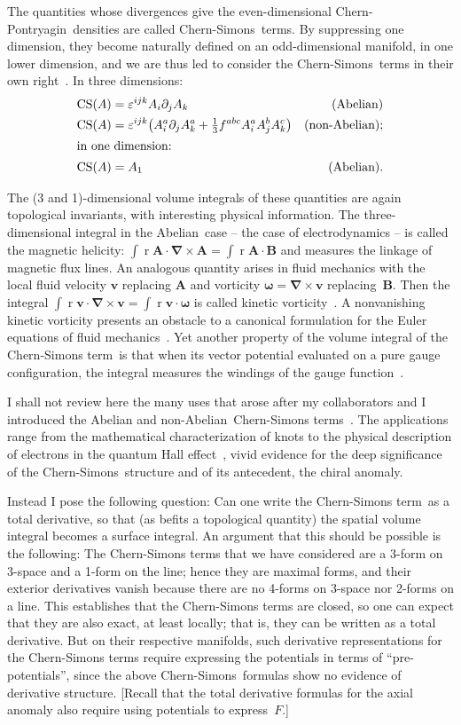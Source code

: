 \documentclass[a4paper,12pt,twoside]{article}
\newcommand{\rd}[1]{\mathop{\mathrm{d}#1}}
\newcommand{\fract}[2]{{\textstyle\frac{#1}{#2}}}
\newcommand{\grad}{\vec\nabla}
\newcommand{\nA}{non-Abelian}
\newcommand{\Ab}{Abelian}
\newcommand{\CS}{Chern-Simons}
\newcommand{\CSt}{Chern-Simons term}
\newcommand{\CPt}{Chern-Pontryagin}
\newcommand{\pp}[1]{\partial_{#1}}
\let\vec\boldsymbol
\let\eps\varepsilon
\begin{document}
The quantities whose divergences give the even-dimensional \CPt\ densities  are
called \CS\ terms. By suppressing one dimension, they become naturally defined on
an odd-dimensional manifold, in one lower  dimension,  and we are thus led to
consider the
\CS\ terms in their own right~\cite{ref7}. In three dimensions:
\begin{align}
\mathrm{CS}(A) &= \eps^{ijk} A_i \pp j A_k & \text{(Abelian)}\label{eq7}\\
\mathrm{CS}(A) &= \eps^{ijk} \bigl(A_i^a \pp j A_k^a +\fract13 f^{abc} A_i^a A_j^b
A_k^c\bigr)
 & \text{(non-Abelian);}\label{eq8}\\
\intertext{in one dimension:}
\mathrm{CS}(A) &= A_1 &\mbox{(\Ab).}\label{eq-9}
\end{align}

The (3 and 1)-dimensional volume integrals of these quantities are again topological
invariants, with interesting physical information. The three-dimensional integral in
the \Ab\ case -- the case of electrodynamics -- is called the magnetic helicity: 
$\int \rd{^3 r} \vec A\cdot \grad
\times \vec A = 
\int \rd{^3 r} \vec A\cdot \vec B$ and measures the linkage of magnetic flux lines.
An analogous quantity arises in fluid mechanics  with the local fluid velocity $\vec v$
replacing
$\vec A$  and  vorticity $\vec\omega = \grad\times\vec v$ replacing~$\vec B$.
Then the integral $\int \rd{^3 r} \vec v\cdot \grad\times \vec v = \int \rd{^3 r} \vec
v\cdot \vec \omega$ is called kinetic vorticity~\cite{ref8}. A nonvanishing kinetic
vorticity presents an obstacle to a canonical formulation for the Euler equations of
fluid mechanics~\cite{ref10}. Yet another property of the volume integral of the \CSt\
is that when its vector potential evaluated on a pure gauge configuration, the integral 
measures the windings of the gauge function~\cite{ref6,ref7}.

I shall not review here the many uses that arose after my collaborators and I
introduced  the Abelian and
\nA\ 
\CSt s~\cite{ref7}. The applications range from the
mathematical characterization of knots to the physical description of electrons in the
quantum Hall effect~\cite{ref9},  vivid evidence for the deep significance of the \CS\
structure and of its antecedent, the chiral anomaly.

Instead I pose the following question: Can one write the \CSt\ as a total derivative, so
that (as befits a topological quantity) the spatial volume integral becomes a surface
integral. An argument that this should be possible is the following: The
\CSt s that we have considered are a 3-form on 3-space and a 1-form on the line;
hence they are maximal forms, and their exterior derivatives vanish because there
are no 4-forms on 3-space nor 2-forms on a line. This establishes that the \CSt s are
closed, so one can expect that they are also exact, at least locally; that is, they can be
written as a total derivative.  But on their respective manifolds,  such derivative 
representations for the
\CSt s require expressing the potentials in terms of ``pre-potentials'', since the 
above \CS\ formulas show no evidence of derivative structure.
[Recall that the total derivative formulas  for
the axial anomaly also require using potentials to express~$F$.]
\end{document}
